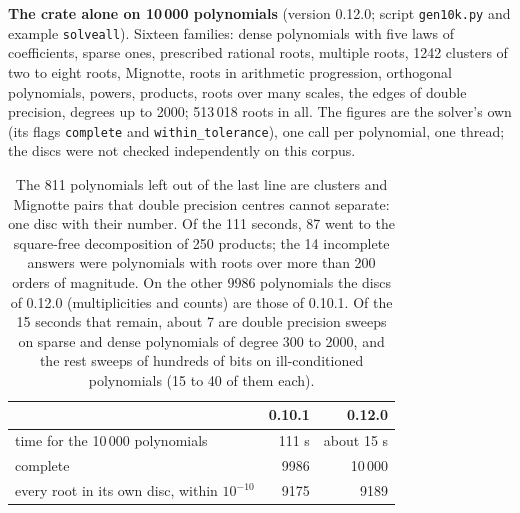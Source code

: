 \documentclass[10pt,a4paper]{article}
\theoremstyle{definition}
\numberwithin{equation}{section}
\begin{document}
\textbf{The crate alone on 10\,000 polynomials} (version 0.12.0; script \texttt{gen10k.py} and example
\texttt{solveall}). Sixteen families: dense polynomials with five laws of coefficients, sparse ones,
prescribed rational roots, multiple roots, 1242 clusters of two to eight roots, Mignotte, roots in
arithmetic progression, orthogonal polynomials, powers, products, roots over many scales, the edges of
double precision, degrees up to 2000; 513\,018 roots in all. The figures are the solver's own (its flags
\texttt{complete} and \texttt{within\_tolerance}), one call per polynomial, one thread; the discs were
not checked independently on this corpus.
\begin{table}[H]\centering\small
\begin{tabular}{lrr}
\toprule
 & 0.10.1 & 0.12.0\\
\midrule
time for the 10\,000 polynomials & 111 s & about 15 s\\
complete & 9986 & 10\,000\\
every root in its own disc, within $10^{-10}$ & 9175 & 9189\\
\bottomrule
\end{tabular}
\caption{The 811 polynomials left out of the last line are clusters and Mignotte pairs that double
precision centres cannot separate: one disc with their number. Of the 111 seconds, 87 went to the
square-free decomposition of 250 products; the 14 incomplete answers were polynomials with roots over
more than 200 orders of magnitude. On the other 9986 polynomials the discs of 0.12.0 (multiplicities and
counts) are those of 0.10.1. Of the 15 seconds that remain, about 7 are double precision sweeps on sparse
and dense polynomials of degree 300 to 2000, and the rest sweeps of hundreds of bits on ill-conditioned
polynomials (15 to 40 of them each).}\label{tab:tenk}
\end{table}
\end{document}
